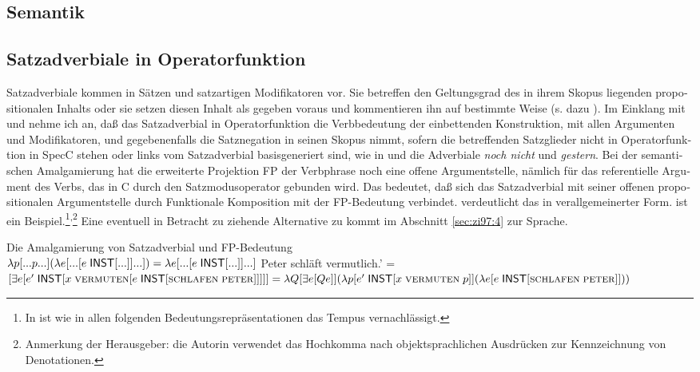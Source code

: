 \documentclass[output=paper, colorlinks, citecolor=brown, booklanguage=german]{langscibook}
\begin{document}
\begin{otherlanguage}{german}
\section{Semantik} \label{sec:zi97:3}

\subsection{Satzadverbiale in Operatorfunktion} \label{sec:zi97:3.1}

Satzadverbiale kommen in Sätzen und satzartigen Modifikatoren vor. Sie betreffen den Geltungsgrad des in ihrem Skopus liegenden propositionalen Inhalts oder sie setzen diesen Inhalt als gegeben voraus und kommentieren ihn auf bestimmte Weise (s. dazu \citealt{brandt1997derredesituierendewiesatz}%
). Im Einklang mit \citet{brandt1989satzmodusmodalitatundperformativitat} und \citet{brandt1992satztyp} nehme ich an, daß das Satzadverbial in Operatorfunktion die Verbbedeutung der einbettenden Konstruktion, mit allen Argumenten und Modifikatoren, und gegebenenfalls die Satznegation in seinen Skopus nimmt, sofern die betreffenden Satzglieder nicht in Operatorfunktion in SpecC stehen oder links vom Satzadverbial basisgeneriert sind, wie in  und  die Adverbiale \textit{noch nicht} und \textit{gestern}. Bei der semantischen Amalgamierung hat die erweiterte Projektion FP der Verbphrase noch eine offene Argumentstelle, nämlich für das referentielle Argument des Verbs, das in C durch den Satzmodusoperator gebunden wird. Das bedeutet, daß sich das Satzadverbial mit seiner offenen propositionalen Argumentstelle durch Funktionale Komposition mit der FP-Bedeutung verbindet.  verdeutlicht das in verallgemeinerter Form.  ist ein Beispiel.\footnote{In  ist wie in allen folgenden Bedeutungsrepräsentationen das Tempus vernachlässigt.}\textsuperscript{,}\footnote{Anmerkung der Herausgeber: die Autorin verwendet das Hochkomma nach objektsprachlichen Ausdrücken zur Kennzeichnung von Denotationen.} Eine eventuell in Betracht zu ziehende Alternative zu  kommt im Abschnitt \ref{sec:zi97:4} zur Sprache.

\newpage
\ea Die Amalgamierung von Satzadverbial und FP-Bedeutung \\
$\lambda p [...p...](\lambda e [...[e \; \cnst{inst} [...]]...]) = \newline\lambda e [...[e \; \cnst{inst} [...]]...]$ \label{ex:zi97:41}
\ex Peter schläft vermutlich.' = \\
$[\exists e [e' \; \cnst{inst} [x \; \textsc{vermuten} [e \; \cnst{inst} [\textsc{schlafen} \; \textsc{peter} ]]]]] = \newline \lambda Q [\exists e [Q e]] (\lambda p [e' \; \cnst{inst} [x \; \textsc{vermuten} \; p]] (\lambda e [e \; \cnst{inst} [\textsc{schlafen} \; \textsc{peter}]]))$ \label{ex:zi97:42}
\z


\end{otherlanguage}
\end{document}
